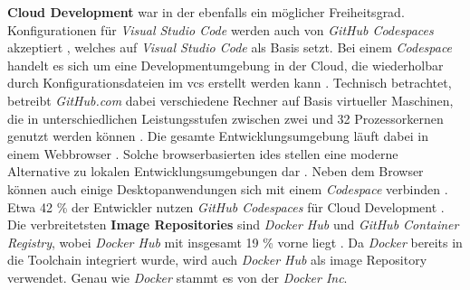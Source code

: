 \textbf{Cloud Development} war in der  ebenfalls ein möglicher Freiheitsgrad.  Konfigurationen für \textit{Visual Studio Code} werden auch von \textit{GitHub Codespaces} akzeptiert \cite{306:Development-Containers}, welches auf \textit{Visual Studio Code} als Basis setzt. Bei einem \textit{Codespace} handelt es sich um eine Developmentumgebung in der Cloud, die wiederholbar durch Konfigurationsdateien im \Gls{vcs} erstellt werden kann \cite{310:GitHub-Codespaces-Overview}. Technisch betrachtet, betreibt \textit{GitHub.com} dabei verschiedene Rechner auf Basis virtueller Maschinen, die in unterschiedlichen Leistungsstufen zwischen zwei und 32 Prozessorkernen genutzt werden können \cite{306:Development-Containers}. Die gesamte Entwicklungsumgebung läuft dabei in einem Webbrowser \cite{310:GitHub-Codespaces-Overview}. Solche browserbasierten \Glspl{ide} stellen eine moderne Alternative zu lokalen Entwicklungsumgebungen dar \cite{004:Continuous-Integration-and-Development-Tool-Setup-and-Pipeline-Evolution}. Neben dem Browser können auch einige Desktopanwendungen sich mit einem \textit{Codespace} verbinden \cite{310:GitHub-Codespaces-Overview}. Etwa 42 \% der Entwickler nutzen \textit{GitHub Codespaces} für Cloud Development \cite{207:Developer-Ecosystem}. Die verbreitetsten \textbf{Image Repositories} sind \textit{Docker Hub} und \textit{GitHub Container Registry}, wobei \textit{Docker Hub} mit insgesamt 19 \% vorne liegt \cite{207:Developer-Ecosystem}. Da \textit{Docker} bereits in die Toolchain integriert wurde, wird auch \textit{Docker Hub} als \Gls{image} Repository verwendet. Genau wie \textit{Docker} stammt es von der \textit{Docker Inc}.

